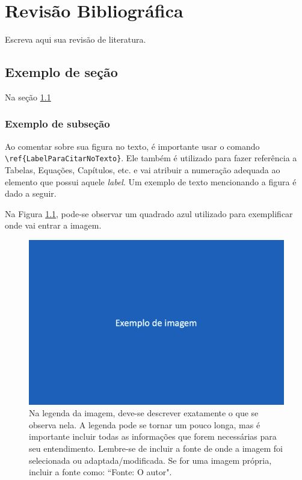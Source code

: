 \chapter{Revisão Bibliográfica}
\label{ch:revisaobibliografica}

Escreva aqui sua revisão de literatura. 

\section{Exemplo de seção}
\label{sec:exemplo}

Na seção \ref{sec:exemplo}

\subsection{Exemplo de subseção}

Ao comentar sobre sua figura no texto, é importante usar o comando \verb_\ref{LabelParaCitarNoTexto}_. Ele também é utilizado para fazer referência a Tabelas, Equações, Capítulos, etc. e vai atribuir a numeração adequada ao elemento que possui aquele \textit{label}. Um exemplo de texto mencionando a figura é dado a seguir.

Na Figura \ref{LabelParaCitarNoTexto}, pode-se observar um quadrado azul utilizado para exemplificar onde vai entrar a imagem.
\begin{figure}[!h]
    \centering
    \includegraphics[width=.65\textwidth]{Imgs/RevisaoBibliografica/ExemploImagem.png}
    \caption[Titulo da imagem, como deve aparecer na lista.]{Na legenda da imagem, deve-se descrever exatamente o que se observa nela. A legenda pode se tornar um pouco longa, mas é importante incluir todas as informações que forem necessárias para seu entendimento. Lembre-se de incluir a fonte de onde a imagem foi selecionada ou adaptada/modificada. Se for uma imagem própria, incluir a fonte como: ``Fonte: O autor".}
    \label{LabelParaCitarNoTexto}
\end{figure}

